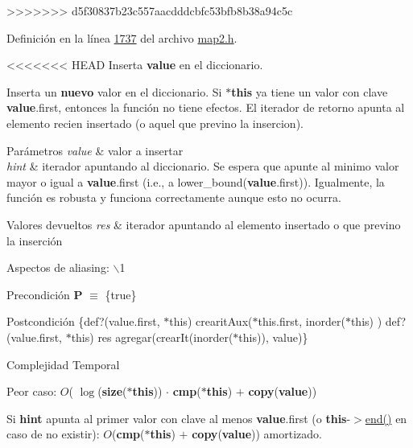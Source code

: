 >>>>>>> d5f30837b23c557aacdddcbfc53bfb8b38a94c5c

Definición en la línea \hyperlink{map2_8h_source_l01737}{1737} del archivo \hyperlink{map2_8h_source}{map2.\+h}.

<<<<<<< HEAD
\-Inserta {\bfseries value} en el diccionario. 

\-Inserta un {\bfseries nuevo} valor en el diccionario. \-Si {\bfseries $\ast$this} ya tiene un valor con clave {\bfseries value}.first, entonces la función no tiene efectos. \-El iterador de retorno apunta al elemento recien insertado (o aquel que previno la insercion).


\begin{DoxyParams}{\-Parámetros}
{\em value} & valor a insertar \\
\hline
{\em hint} & iterador apuntando al diccionario. \-Se espera que apunte al minimo valor mayor o igual a {\bfseries value}.first (i.\-e., a lower\-\_\-bound({\bfseries value}.first)). \-Igualmente, la función es robusta y funciona correctamente aunque esto no ocurra. \\
\hline
\end{DoxyParams}

\begin{DoxyRetVals}{\-Valores devueltos}
{\em res} & iterador apuntando al elemento insertado o que previno la inserción\\
\hline
\end{DoxyRetVals}
\begin{DoxyParagraph}{\-Aspectos de aliasing\-:}
$\backslash$1
\end{DoxyParagraph}
\begin{DoxyPrecond}{\-Precondición}
{\bfseries \-P} $\equiv$ \{true\} 
\end{DoxyPrecond}
\begin{DoxyPostcond}{\-Postcondición}
\{def?(value.\-first, $\ast$this)  crearit\-Aux($\ast$this.first, inorder($\ast$this) )   def?(value.\-first, $\ast$this)  res  agregar(crear\-It(inorder($\ast$this)), value)\}
\end{DoxyPostcond}

\begin{DoxyDescription}
\item[\-Complejidad \-Temporal]
\begin{DoxyItemize}
\item \-Peor caso\-: $O$( $\log$({\bfseries size}({\bfseries $\ast$this})) $\cdot$ {\bfseries cmp}({\bfseries $\ast$this}) $+$ {\bfseries copy}({\bfseries value}))
\item \-Si {\bfseries hint} apunta al primer valor con clave al menos {\bfseries value}.first (o {\bfseries this}-\/$>$\hyperlink{classaed2_1_1iterator_a67caf9468be999e9be96b7add5d79946_a67caf9468be999e9be96b7add5d79946}{end()} en caso de no existir)\-: $O$({\bfseries cmp}({\bfseries $\ast$this}) $+$ {\bfseries copy}({\bfseries value})) amortizado. 
\end{DoxyItemize}
\end{DoxyDescription}

